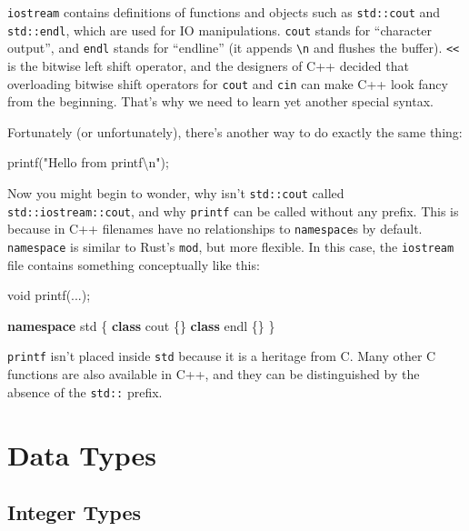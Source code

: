 \documentclass[
]{book}
\newenvironment{Shaded}{\begin{snugshade}}{\end{snugshade}}
\newcommand{\DataTypeTok}[1]{\textcolor[rgb]{0.13,0.29,0.53}{#1}}
\newcommand{\KeywordTok}[1]{\textcolor[rgb]{0.13,0.29,0.53}{\textbf{#1}}}
\newcommand{\NormalTok}[1]{#1}
\newcommand{\SpecialCharTok}[1]{\textcolor[rgb]{0.00,0.00,0.00}{#1}}
\newcommand{\StringTok}[1]{\textcolor[rgb]{0.31,0.60,0.02}{#1}}
\begin{document}
\texttt{iostream} contains definitions of functions and objects such as \texttt{std::cout} and \texttt{std::endl}, which are used for IO manipulations. \texttt{cout} stands for ``character output'', and \texttt{endl} stands for ``endline'' (it appends \texttt{\textbackslash{}n} and flushes the buffer). \texttt{\textless{}\textless{}} is the bitwise left shift operator, and the designers of C++ decided that overloading bitwise shift operators for \texttt{cout} and \texttt{cin} can make C++ look fancy from the beginning. That's why we need to learn yet another special syntax.

Fortunately (or unfortunately), there's another way to do exactly the same thing:

\begin{Shaded}
\begin{Highlighting}[]
\NormalTok{printf(}\StringTok{"Hello from printf}\SpecialCharTok{\textbackslash{}n}\StringTok{"}\NormalTok{);}
\end{Highlighting}
\end{Shaded}

Now you might begin to wonder, why isn't \texttt{std::cout} called \texttt{std::iostream::cout}, and why \texttt{printf} can be called without any prefix. This is because in C++ filenames have no relationships to \texttt{namespace}s by default. \texttt{namespace} is similar to Rust's \texttt{mod}, but more flexible. In this case, the \texttt{iostream} file contains something conceptually like this:

\begin{Shaded}
\begin{Highlighting}[]
\DataTypeTok{void}\NormalTok{ printf(...);}

\KeywordTok{namespace}\NormalTok{ std \{}
    \KeywordTok{class}\NormalTok{ cout \{\}}
    \KeywordTok{class}\NormalTok{ endl \{\}}
\NormalTok{\}}
\end{Highlighting}
\end{Shaded}

\texttt{printf} isn't placed inside \texttt{std} because it is a heritage from C. Many other C functions are also available in C++, and they can be distinguished by the absence of the \texttt{std::} prefix.

\hypertarget{data-types}{%
\section{Data Types}\label{data-types}}

\hypertarget{integer-types}{%
\subsection{Integer Types}\label{integer-types}}
\end{document}
